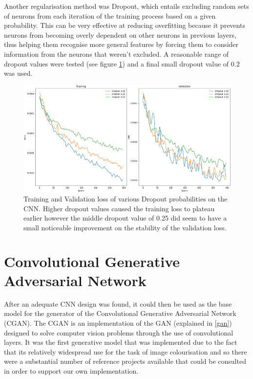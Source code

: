 \documentclass{l4proj}
\begin{document}
Another regularisation method was Dropout, which entails excluding random sets of neurons from each iteration of the training process based on a given probability. This can be very effective at reducing overfitting because it prevents neurons from becoming overly dependent on other neurons in previous layers, thus helping them recognise more general features by forcing them to consider information from the neurons that weren't excluded. A reasonable range of dropout values were tested (see figure \ref{fig:dropout}) and a final small dropout value of 0.2 was used.
\begin{figure}[H]
    \centering
    \includegraphics[width=0.9\linewidth]{images/Dropout.png}    

    \caption{Training and Validation loss of various Dropout probabilities on the CNN. Higher dropout values caused the training loss to plateau earlier however the middle dropout value of 0.25 did seem to have a small noticeable improvement on the stability of the validation loss.}

    \label{fig:dropout} 
\end{figure}

\section{Convolutional Generative Adversarial Network}
\label{gan-implementation}
After an adequate CNN design was found, it could then be used as the base model for the generator of the Convolutional Generative Adversarial Network (CGAN). The CGAN is an implementation of the GAN (explained in \ref{gan}) designed to solve computer vision problems through the use of convolutional layers. It was the first generative model that was implemented due to the fact that its relatively widespread use for the task of image colourisation and so there were a substantial number of reference projects available that could be consulted in order to support our own implementation.
\end{document}
